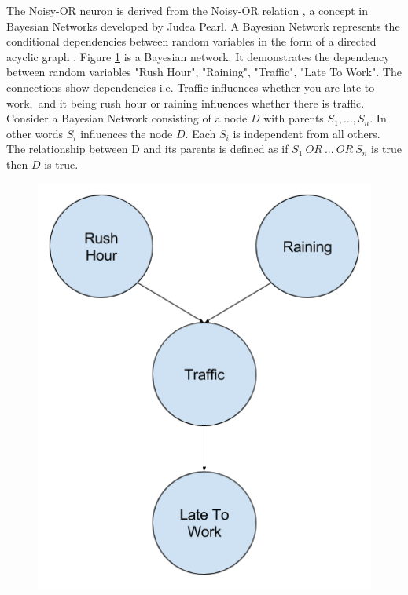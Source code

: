 \noindent
\begin{minipage}[t]{0.6\textwidth}
\vspace{0px}
The Noisy-OR neuron is derived from the Noisy-OR relation \cite{russell1995modern}, a concept in Bayesian Networks developed by Judea Pearl. A Bayesian Network represents the conditional dependencies between random variables in the form of a directed acyclic graph \cite{neapolitan2004learning}. Figure \ref{fig:bayesian-network-example} is a Bayesian network. It demonstrates the dependency between random variables "Rush Hour", "Raining", "Traffic", "Late To Work". The connections show dependencies i.e. Traffic influences whether you are late to work,\ and it being rush hour or raining influences whether there is traffic.\\

Consider a Bayesian Network consisting of a node $D$ with parents $S_1,..., S_n$. In other words $S_i$ influences the node $D$. Each $S_i$ is independent from all others. The relationship between D and its parents is defined as if $S_1\ OR\ ...\ OR\ S_n$ is true then $D$ is true.\\
\end{minipage}
\hspace{0.05\textwidth}
\begin{minipage}[t]{0.35\textwidth}
\vspace{0px}
\begin{figure}[H]
	\centering
	\begin{minipage}[b]{1.0\textwidth}
		\includegraphics[width=\textwidth]{bayesian-network-example.png}
		\caption{}
		\label{fig:bayesian-network-example}
	\end{minipage}
	\hfill
\end{figure}
\end{minipage}

